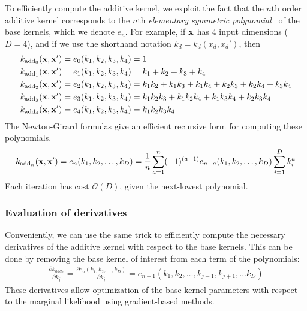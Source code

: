 To efficiently compute the additive kernel, we exploit the fact that the $n$th order additive kernel corresponds to the $n$th \textit{elementary symmetric polynomial}~\citep{macdonald1998symmetric}
of the base kernels, which we denote $e_n$.
For example, if ${\bf{x}}$ has 4 input dimensions ($D = 4$), and if we use the shorthand notation $k_d = k_d(x_d, x_d')$, then
%
\begin{align}
k_{\textnormal{add}_0}({\bf x, x'}) & = e_0( k_1, k_2, k_3, k_4 ) = 1 \\
k_{\textnormal{add}_1}({\bf x, x'}) & = e_1( k_1, k_2, k_3, k_4 ) = k_1 + k_2 + k_3 + k_4 \\
k_{\textnormal{add}_2}({\bf x, x'}) & = e_2( k_1, k_2, k_3, k_4 ) = k_1 k_2 + k_1 k_3 + k_1k_4 + k_2 k_3 + k_2 k_4 + k_3 k_4 \\
k_{\textnormal{add}_3}({\bf x, x'}) & = e_3( k_1, k_2, k_3, k_4 ) = k_1 k_2 k_3 + k_1 k_2 k_4 + k_1 k_3 k_4 + k_2 k_3 k_4 \\
k_{\textnormal{add}_4}({\bf x, x'}) & = e_4( k_1, k_2, k_3, k_4 ) = k_1 k_2 k_3 k_4
\end{align}
%
The Newton-Girard formulas give an efficient recursive form for computing these polynomials.
%
\begin{align}
k_{\textnormal{add}_n}({\bf x, x'}) = e_n(k_1,k_2,\dots,k_D) = \frac{1}{n} \sum_{a=1}^n (-1)^{(a-1)} e_{n-a}(k_1, k_2, \dots,k_D)  \sum_{i=1}^Dk_i^a
\end{align}
%
Each iteration has cost $\mathcal{O}(D)$, given the next-lowest polynomial.


\subsubsection{Evaluation of derivatives}

Conveniently, we can use the same trick to efficiently compute the necessary derivatives of the additive kernel with respect to the base kernels.
This can be done by removing the base kernel of interest from each term of the polynomials:
%
\begin{align}
\frac{\partial k_{add_n}}{\partial k_j} = 
\frac{\partial e_{n}(k_1,k_2,\dots, k_D)}{\partial k_j} = 
e_{n-1}(k_1, k_2, \dots,k_{j-1},k_{j+1}, \dots k_D)
\end{align}
%
These derivatives allow optimization of the base kernel parameters with respect to the marginal likelihood using gradient-based methods.

